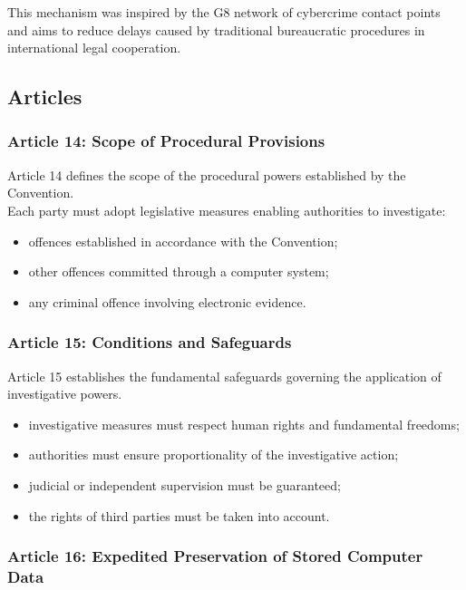 \noindent
This mechanism was inspired by the G8 network of cybercrime contact points and aims to reduce delays caused by traditional bureaucratic procedures in international legal cooperation.


\subsection{Articles}

\subsubsection*{Article 14: Scope of Procedural Provisions}

Article 14 defines the scope of the procedural powers established by the Convention.\\
Each party must adopt legislative measures enabling authorities to investigate:

\begin{itemize}
\item offences established in accordance with the Convention;
\item other offences committed through a computer system;
\item any criminal offence involving electronic evidence.
\end{itemize}



\subsubsection*{Article 15: Conditions and Safeguards}

Article 15 establishes the fundamental safeguards governing the application of investigative powers.

\begin{itemize}
\item investigative measures must respect human rights and fundamental freedoms;
\item authorities must ensure proportionality of the investigative action;
\item judicial or independent supervision must be guaranteed;
\item the rights of third parties must be taken into account.
\end{itemize}



\subsubsection*{Article 16: Expedited Preservation of Stored Computer Data}

